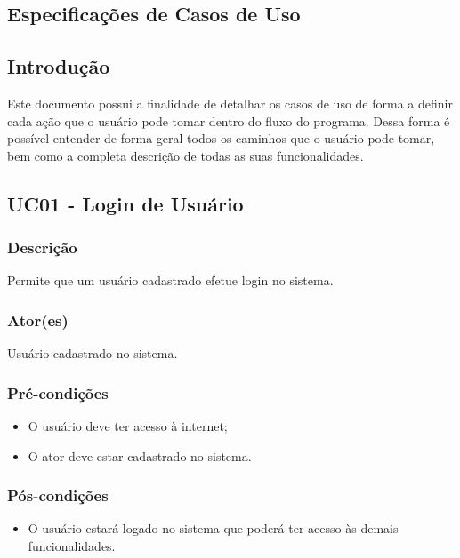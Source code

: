 \begin{anexosenv}

\partanexos

\chapter{Especificações de Casos de Uso}

\section*{Introdução}
    Este documento possui a finalidade de detalhar os casos de uso de forma a definir cada ação que o usuário pode tomar dentro do fluxo do programa. Dessa forma é possível entender de forma geral todos os caminhos que o usuário pode tomar, bem como a completa descrição de todas as suas funcionalidades.

\section{UC01 \-- Login de Usuário}
    \subsection{Descrição}
        Permite que um usuário cadastrado efetue login no sistema.
    \subsection{Ator(es)}
        Usuário cadastrado no sistema.
    \subsection{Pré-condições}
        \begin{itemize}
            \item O usuário deve ter acesso à internet;
            \item O ator deve estar cadastrado no sistema.
        \end{itemize}
    \subsection{Pós-condições}
        \begin{itemize}
            \item O usuário estará logado no sistema que poderá ter acesso às demais funcionalidades.
        \end{itemize}

\end{anexosenv}
